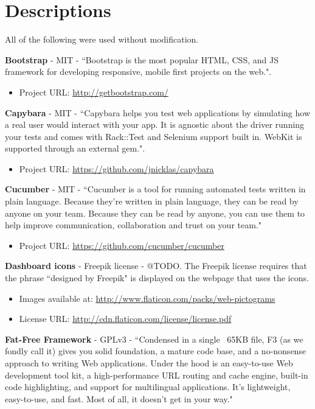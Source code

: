 \section{Descriptions}

All of the following were used without modification.

\textbf{Bootstrap} - MIT - ``Bootstrap is the most popular HTML, CSS, and JS framework for developing responsive, mobile first projects on the web.".

\begin{itemize}
\item Project URL: \url{http://getbootstrap.com/}
\end{itemize}

\textbf{Capybara} - MIT - ``Capybara helps you test web applications by simulating how a real user would interact with your app. It is agnostic about the driver running your tests and comes with Rack::Test and Selenium support built in. WebKit is supported through an external gem.". 

\begin{itemize}
\item Project URL: \url{https://github.com/jnicklas/capybara}
\end{itemize}

\textbf{Cucumber} - MIT - ``Cucumber is a tool for running automated tests written in plain language. Because they're written in plain language, they can be read by anyone on your team. Because they can be read by anyone, you can use them to help improve communication, collaboration and trust on your team."

\begin{itemize}
\item Project URL: \url{https://github.com/cucumber/cucumber}
\end{itemize}

\textbf{Dashboard icons} - Freepik license - @TODO. The Freepik license requires that the phrase ``designed by Freepik" is displayed on the webpage that uses the icons.

\begin{itemize}
\item Images available at: \url{http://www.flaticon.com/packs/web-pictograms}
\item License URL: \url{http://cdn.flaticon.com/license/license.pdf}
\end{itemize}

\textbf{Fat-Free Framework} - GPLv3 - ``Condensed in a single ~65KB file, F3 (as we fondly call it) gives you solid foundation, a mature code base, and a no-nonsense approach to writing Web applications. Under the hood is an easy-to-use Web development tool kit, a high-performance URL routing and cache engine, built-in code highlighting, and support for multilingual applications. It's lightweight, easy-to-use, and fast. Most of all, it doesn't get in your way."

